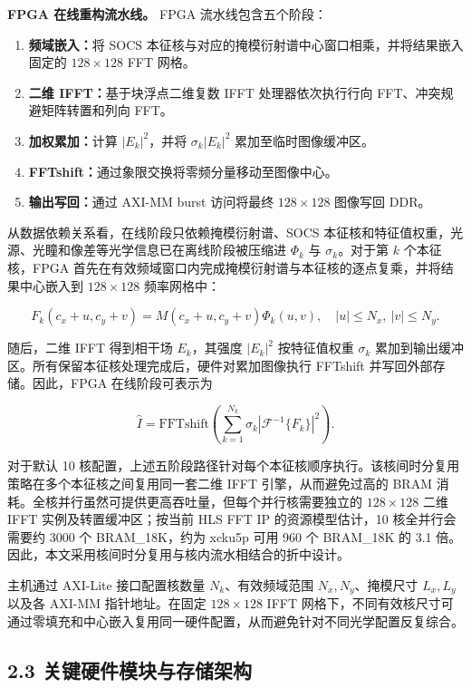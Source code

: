 \documentclass[
  preprint]{elsarticle}
\providecommand{\tightlist}{%
  \setlength{\itemsep}{0pt}\setlength{\parskip}{0pt}}
\begin{document}
\textbf{FPGA 在线重构流水线。} FPGA 流水线包含五个阶段：

\begin{enumerate}
\def\labelenumi{\arabic{enumi}.}
\tightlist
\item
  \textbf{频域嵌入：}将 SOCS
  本征核与对应的掩模衍射谱中心窗口相乘，并将结果嵌入固定的
  \(128 \times 128\) FFT 网格。
\item
  \textbf{二维 IFFT：}基于块浮点二维复数 IFFT 处理器依次执行行向
  FFT、冲突规避矩阵转置和列向 FFT。
\item
  \textbf{加权累加：}计算 \(|E_k|^2\)，并将 \(\sigma_k|E_k|^2\)
  累加至临时图像缓冲区。
\item
  \textbf{FFTshift：}通过象限交换将零频分量移动至图像中心。
\item
  \textbf{输出写回：}通过 AXI-MM burst 访问将最终 \(128 \times 128\)
  图像写回 DDR。
\end{enumerate}

从数据依赖关系看，在线阶段只依赖掩模衍射谱、SOCS
本征核和特征值权重，光源、光瞳和像差等光学信息已在离线阶段被压缩进
\(\Phi_k\) 与 \(\sigma_k\)。对于第 \(k\) 个本征核，FPGA
首先在有效频域窗口内完成掩模衍射谱与本征核的逐点复乘，并将结果中心嵌入到
\(128 \times 128\) 频率网格中：

\[
F_k(c_x+u,c_y+v)=M(c_x+u,c_y+v)\Phi_k(u,v),
\quad |u|\leq N_x,\ |v|\leq N_y .
\tag{7}
\]

随后，二维 IFFT 得到相干场 \(E_k\)，其强度 \(|E_k|^2\) 按特征值权重
\(\sigma_k\)
累加到输出缓冲区。所有保留本征核处理完成后，硬件对累加图像执行 FFTshift
并写回外部存储。因此，FPGA 在线阶段可表示为

\[
\hat{I}=\mathrm{FFTshift}\left(\sum_{k=1}^{N_k}\sigma_k
\left|\mathcal{F}^{-1}\{F_k\}\right|^2\right).
\tag{8}
\]

对于默认 10
核配置，上述五阶段路径针对每个本征核顺序执行。该核间时分复用策略在多个本征核之间复用同一套二维
IFFT 引擎，从而避免过高的 BRAM
消耗。全核并行虽然可提供更高吞吐量，但每个并行核需要独立的
\(128 \times 128\) 二维 IFFT 实例及转置缓冲区；按当前 HLS FFT IP
的资源模型估计，10 核全并行会需要约 3000 个 BRAM\_18K，约为 xcku5p 可用
960 个 BRAM\_18K 的 3.1
倍。因此，本文采用核间时分复用与核内流水相结合的折中设计。

主机通过 AXI-Lite 接口配置核数量 \(N_k\)、有效频域范围
\(N_x,N_y\)、掩模尺寸 \(L_x,L_y\) 以及各 AXI-MM 指针地址。在固定
\(128 \times 128\) IFFT
网格下，不同有效核尺寸可通过零填充和中心嵌入复用同一硬件配置，从而避免针对不同光学配置反复综合。

\subsection{2.3
关键硬件模块与存储架构}\label{ux5173ux952eux786cux4ef6ux6a21ux5757ux4e0eux5b58ux50a8ux67b6ux6784}
\end{document}
